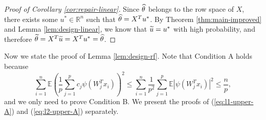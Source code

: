 \begin{proof}[Proof of Corollary \ref{cor:repair-linear}]
Since $\widehat{\theta}$ belongs to the row space of $X$, there exists some $u^*\in\mathbb{R}^n$ such that $\widehat{\theta}=X^Tu^*$.
By Theorem \ref{thm:main-improved} and Lemma \ref{lem:design-linear}, we know that $\widetilde{u}=u^*$ with high probability, and therefore $\widetilde{\theta}=X^T\widetilde{u}=X^Tu^*=\widehat{\theta}$.
\end{proof}


Now we state the proof of Lemma \ref{lem:design-rf}. Note that Condition A holds because
$$\sum_{i=1}^n\mathbb{E}\left(\frac{1}{p}\sum_{j=1}^pc_j\psi(W_j^Tx_i)\right)^2  \leq \sum_{i=1}^n\frac{1}{p^2}\sum_{j=1}^p\mathbb{E}|\psi(W_j^Tx_i)|^2\leq \frac{n}{p},$$
and we only need to prove Condition B. We present the proofs of (\ref{eq:l1-upper-A}) and (\ref{eq:l2-upper-A}) separately.
